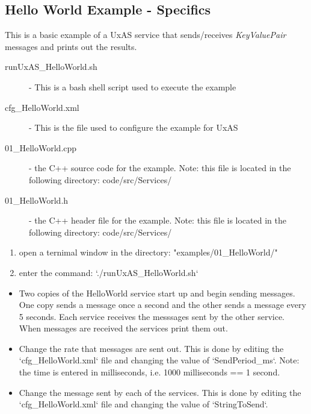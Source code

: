 \subsection{Hello World Example - Specifics}

This is a basic example of a UxAS service that sends/receives \textit{KeyValuePair} messages and prints out the results. 

\begin{description}
\item[runUxAS\_HelloWorld.sh] - This is a bash shell script used to execute the example

\item[cfg\_HelloWorld.xml] - This is the file used to configure the example for UxAS

\item[01\_HelloWorld.cpp] - the C++ source code for the example. Note: this file is located in the following directory:
        code/src/Services/

\item[01\_HelloWorld.h] - the C++ header file for the example. Note: this file is located in the following directory:
        code/src/Services/
\end{description}

\begin{enumerate}
\item open a ternimal window in the directory: "examples/01\_HelloWorld/"
\item enter the command: `./runUxAS\_HelloWorld.sh`
\end{enumerate}

\begin{itemize}
\item Two copies of the HelloWorld service start up and begin sending messages. One copy sends a message once a second and the other sends a message every 5 seconds. Each service receives the messsages sent by the other service. When messages are received the services print them out.
\end{itemize} 

\begin{itemize}
\item Change the rate that messages are sent out. This is done by editing the `cfg\_HelloWorld.xml` file and changing the value of `SendPeriod\_ms`. Note: the time is entered in milliseconds, i.e. 1000 milliseconds == 1 second.
\item Change the message sent by each of the services. This is done by editing the `cfg\_HelloWorld.xml` file and changing the value of `StringToSend`.
\end{itemize} 



